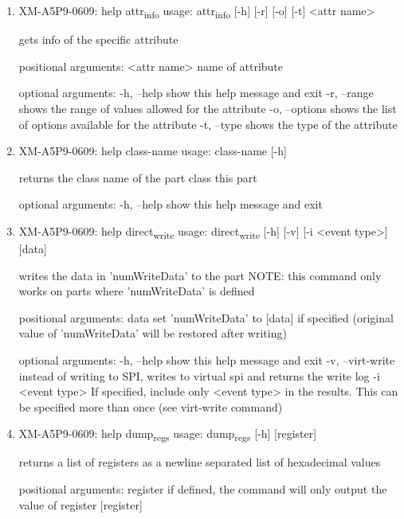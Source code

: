 \documentclass[11pt]{article}
\begin{document}
\begin{enumerate}
\item XM-A5P9-0609: help attr\textsubscript{info}
\label{sec:org0c40adc}
usage: attr\textsubscript{info} [-h] [-r] [-o] [-t] <attr name>

gets info of the specific attribute

positional arguments:
  <attr name>    name of attribute

optional arguments:
  -h, --help     show this help message and exit
  -r, --range    shows the range of values allowed for the attribute
  -o, --options  shows the list of options available for the attribute
  -t, --type     shows the type of the attribute

\item XM-A5P9-0609: help class-name
\label{sec:orgee9e8f0}
usage: class-name [-h]

returns the class name of the part class this part

optional arguments:
  -h, --help  show this help message and exit

\item XM-A5P9-0609: help direct\textsubscript{write}
\label{sec:org177a696}
usage: direct\textsubscript{write} [-h] [-v] [-i <event type>] [data]

writes the data in 'numWriteData' to the part NOTE: this command only works on
parts where 'numWriteData' is defined

positional arguments:
  data              set 'numWriteData' to [data] if specified (original value
                    of 'numWriteData' will be restored after writing)

optional arguments:
  -h, --help        show this help message and exit
  -v, --virt-write  instead of writing to SPI, writes to virtual spi and
                    returns the write log
  -i <event type>   If specified, include only <event type> in the results.
                    This can be specified more than once (see virt-write
                    command)

\item XM-A5P9-0609: help dump\textsubscript{regs}
\label{sec:org3d135cc}
usage: dump\textsubscript{regs} [-h] [register]

returns a list of registers as a newline separated list of hexadecimal values

positional arguments:
  register    if defined, the command will only output the value of register
              [register]


\end{enumerate}
\end{document}
